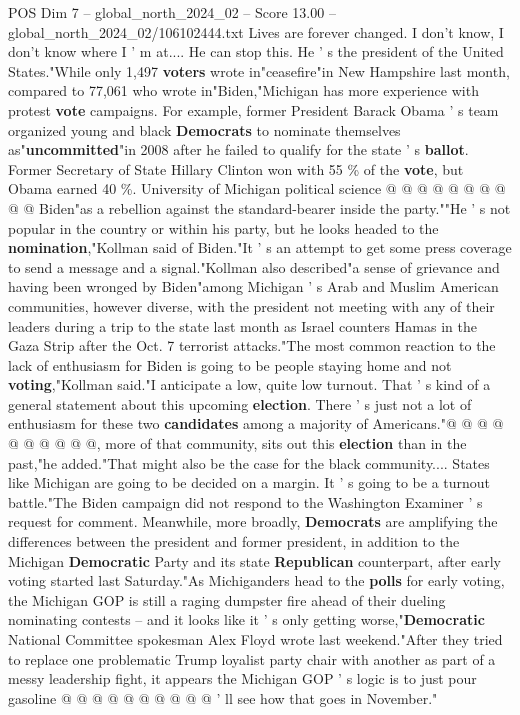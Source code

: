 \begin{textsample}{POS Dim 7 – global\_north\_2024\_02 – Score 13.00 – global\_north\_2024\_02/106102444.txt}
Lives are forever changed.
I don't know, I don't know where I ' m at....
He can stop this.
He ' s the president of the United States."While only 1,497 \textbf{voters} wrote in"ceasefire"in New Hampshire last month, compared to 77,061 who wrote in"Biden,"Michigan has more experience with protest \textbf{vote} campaigns.
For example, former President Barack Obama ' s team organized young and black \textbf{Democrats} to nominate themselves as"\textbf{uncommitted}"in 2008 after he failed to qualify for the state ' s \textbf{ballot}.
Former Secretary of State Hillary Clinton won with 55 \% of the \textbf{vote}, but Obama earned 40 \%.
University of Michigan political science @ @ @ @ @ @ @ @ @ @ Biden"as a rebellion against the standard-bearer inside the party.""He ' s not popular in the country or within his party, but he looks headed to the \textbf{nomination},"Kollman said of Biden."It ' s an attempt to get some press coverage to send a message and a signal."Kollman also described"a sense of grievance and having been wronged by Biden"among Michigan ' s Arab and Muslim American communities, however diverse, with the president not meeting with any of their leaders during a trip to the state last month as Israel counters Hamas in the Gaza Strip after the Oct. 7 terrorist attacks."The most common reaction to the lack of enthusiasm for Biden is going to be people staying home and not \textbf{voting},"Kollman said."I anticipate a low, quite low turnout.
That ' s kind of a general statement about this upcoming \textbf{election}.
There ' s just not a lot of enthusiasm for these two \textbf{candidates} among a majority of Americans."@ @ @ @ @ @ @ @ @ @, more of that community, sits out this \textbf{election} than in the past,"he added."That might also be the case for the black community....
States like Michigan are going to be decided on a margin.
It ' s going to be a turnout battle."The Biden campaign did not respond to the Washington Examiner ' s request for comment.
Meanwhile, more broadly, \textbf{Democrats} are amplifying the differences between the president and former president, in addition to the Michigan \textbf{Democratic} Party and its state \textbf{Republican} counterpart, after early voting started last Saturday."As Michiganders head to the \textbf{polls} for early voting, the Michigan GOP is still a raging dumpster fire ahead of their dueling nominating contests -- and it looks like it ' s only getting worse,"\textbf{Democratic} National Committee spokesman Alex Floyd wrote last weekend."After they tried to replace one problematic Trump loyalist party chair with another as part of a messy leadership fight, it appears the Michigan GOP ' s logic is to just pour gasoline @ @ @ @ @ @ @ @ @ @ ' ll see how that goes in November."

\end{textsample}
